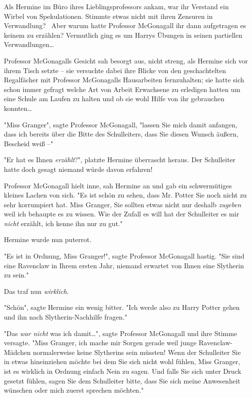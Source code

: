 {Als Hermine im Büro ihres Lieblingsprofessors ankam, war ihr Verstand ein Wirbel von Spekulationen. Stimmte etwas nicht mit ihren Zensuren in Verwandlung? ~Aber warum hatte Professor McGonagall ihr dann aufgetragen es keinem zu erzählen? Vermutlich ging es um Harrys Übungen in seinen partiellen Verwandlungen…

Professor McGonagalls Gesicht sah besorgt aus, nicht streng, als Hermine sich vor ihrem Tisch setzte -- sie versuchte dabei ihre Blicke von den geschachtelten Regalfächer mit Professor McGonagalls Hausarbeiten fernzuhalten; sie hatte sich schon immer gefragt welche Art von Arbeit Erwachsene zu erledigen hatten um eine Schule am Laufen zu halten und ob sie wohl Hilfe von ihr gebrauchen konnten…

"Miss Granger", sagte Professor McGonagall, "lassen Sie mich damit anfangen, dass ich bereits über die Bitte des Schulleiters, dass Sie diesen Wunsch äußern, Bescheid weiß --"

"Er hat es Ihnen \emph{erzählt}?", platzte Hermine überrascht heraus. Der Schulleiter hatte doch gesagt niemand würde davon erfahren!

Professor McGonagall hielt inne, sah Hermine an und gab ein schwermütiges kleines Lachen von sich. "Es ist schön zu sehen, dass Mr. Potter Sie noch nicht zu sehr korrumpiert hat. Miss Granger, Sie sollten etwas nicht nur deshalb \emph{zugeben} weil ich behaupte es zu wissen. Wie der Zufall es will hat der Schulleiter es mir \emph{nicht} erzählt, ich kenne ihn nur zu gut."

Hermine wurde nun puterrot.

"Es ist in Ordnung, Miss Granger!", sagte Professor McGonagall hastig. "Sie sind eine Ravenclaw in Ihrem ersten Jahr, niemand erwartet von Ihnen eine Slytherin zu sein."

Das traf nun \emph{wirklich}.

"Schön", sagte Hermine ein wenig bitter. "Ich werde also zu Harry Potter gehen und ihn nach Slytherin-Nachhilfe fragen."

"Das \emph{war nicht} was ich damit…", sagte Professor McGonagall und ihre Stimme versagte. "Miss Granger, ich mache mir Sorgen gerade weil junge Ravenclaw-Mädchen normalerweise keine Slytherins sein müssten! Wenn der Schulleiter Sie in etwas hineinziehen möchte bei dem Sie sich nicht wohl fühlen, Miss Granger, ist es wirklich in Ordnung einfach Nein zu sagen. Und falls Sie sich unter Druck gesetzt fühlen, sagen Sie dem Schulleiter bitte, dass Sie sich meine Anwesenheit wünschen oder mich zuerst sprechen möchten."

}
